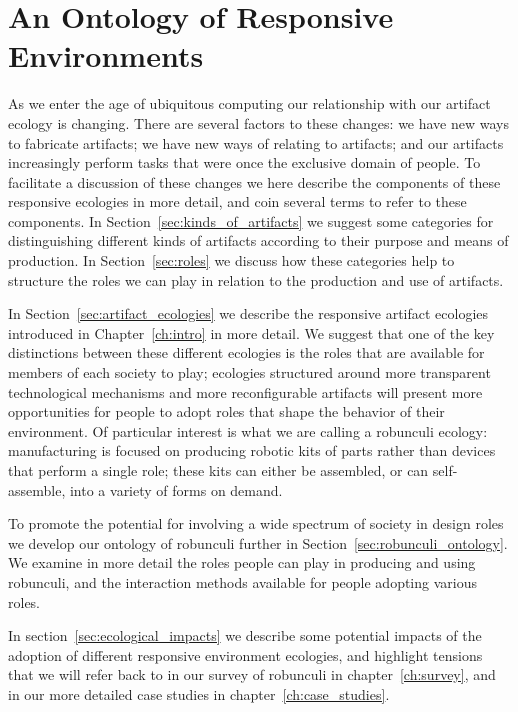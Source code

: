 \chapter{An Ontology of Responsive Environments}
\label{ch:ontology}
%
As we enter the age of ubiquitous computing our relationship with our artifact ecology is changing. 
There are several factors to these changes: we have new ways to fabricate artifacts; we have new ways of relating to artifacts; and our artifacts increasingly perform tasks that were once the exclusive domain of people.
To facilitate a discussion of these changes we here describe the components of these responsive ecologies in more detail, and coin several terms to refer to these components.
In Section~\ref{sec:kinds_of_artifacts} we suggest some categories for distinguishing different kinds of artifacts according to their purpose and means of production.
In Section~\ref{sec:roles} we discuss how these categories help to structure the roles we can play in relation to the production and use of artifacts.

In Section~\ref{sec:artifact_ecologies} we describe the responsive artifact ecologies introduced in Chapter~\ref{ch:intro} in more detail. 
We suggest that one of the key distinctions between these different ecologies is the roles that are available for members of each society to play; ecologies structured around more transparent technological mechanisms and more reconfigurable artifacts will present more opportunities for people to adopt roles that shape the behavior of their environment. 
Of particular interest is what we are calling a robunculi ecology: manufacturing is focused on producing robotic kits of parts rather than devices that perform a single role; these kits can either be assembled, or can self-assemble, into a variety of forms on demand. 

To promote the potential for involving a wide spectrum of society in design roles we develop our ontology of robunculi further in Section~\ref{sec:robunculi_ontology}. 
We examine in more detail the roles people can play in producing and using robunculi, and the interaction methods available for people adopting various roles.

In section~\ref{sec:ecological_impacts} we describe some potential impacts of the adoption of different responsive environment ecologies, and highlight tensions that we will refer back to in our survey of robunculi in chapter~\ref{ch:survey}, and in our more detailed case studies in chapter~\ref{ch:case_studies}.

